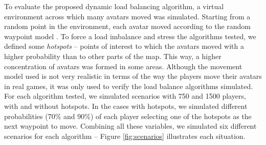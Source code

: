 \documentclass[acmjacm]{acmtrans2m}
\newcommand{\figurecaption}{Figure}
\begin{document}
To evaluate the proposed dynamic load balancing algorithm, a virtual environment across which many avatars moved was simulated. Starting from a random point in the environment, each avatar moved according to the random waypoint model \cite{bettstetter2004spr}. To force a load imbalance and stress the algorithms tested, we defined some \emph{hotspots} -- points of interest to which the avatars moved with a higher probability than to other parts of the map. This way, a higher concentration of avatars was formed in some areas. Although the movement model used is not very realistic in terms of the way the players move their avatars in real games, it was only used to verify the load balance algorithms simulated. For each algorithm tested, we simulated scenarios with 750 and 1500 players, with and without hotspots. In the cases with hotspots, we simulated different probabilities (70\% and 90\%) of each player selecting one of the hotspots as the next waypoint to move. Combining all these variables, we simulated six different scenarios for each algorithm -- \figurecaption{} \ref{fig:scenarios} illustrates each situation.
\end{document}

